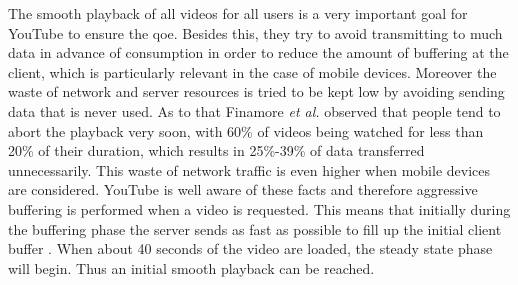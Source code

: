 The smooth playback of all videos for all users is a very important goal for YouTube to ensure the \gls{qoe}. Besides this, they try to avoid transmitting to much data in advance of consumption in order to reduce the amount of buffering at the client, which is particularly relevant in the case of mobile devices. Moreover the waste of network and server resources is tried to be kept low by avoiding sending data that is never used. As to that Finamore \emph{et al.} \cite{inpr:youtube_everywhere} observed that people tend to abort the playback very soon, with 60\% of videos being watched for less than 20\% of their duration, which results in 25\%-39\% of data transferred unnecessarily. This waste of network traffic is even higher when mobile devices are considered. YouTube is well aware of these facts and therefore aggressive buffering is performed when a video is requested. This means that initially during the buffering phase the server sends as fast as possible to fill up the initial client buffer \cite{inp:network_characteristics}. When about 40 seconds of the video are loaded, the steady state phase will begin. Thus an initial smooth playback can be reached.


